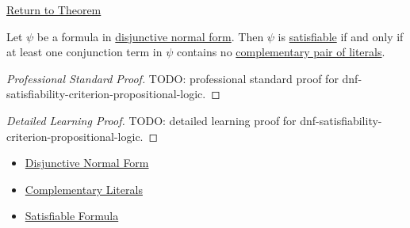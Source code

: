 \newpage
{}
\label{prf:dnf-satisfiability-criterion-propositional-logic}

\begin{remark*}[Return]
\hyperref[thm:dnf-satisfiability-criterion-propositional-logic]{Return to Theorem}
\end{remark*}

\begin{theorem*}
Let \(\psi\) be a formula in
\hyperref[def:disjunctive-normal-form-propositional-logic]{disjunctive normal form}.
Then \(\psi\) is
\hyperref[def:satisfiable-formula-propositional-logic]{satisfiable} if and only
if at least one conjunction term in \(\psi\) contains no
\hyperref[def:complementary-literals-propositional-logic]{complementary pair of literals}.
\end{theorem*}

\begin{proof}[Professional Standard Proof]
\LRAProofBodyStart
TODO: professional standard proof for dnf-satisfiability-criterion-propositional-logic.
\end{proof}

\begin{proof}[Detailed Learning Proof]
\LRAProofBodyStart
TODO: detailed learning proof for dnf-satisfiability-criterion-propositional-logic.
\end{proof}

\begin{remark*}
\end{remark*}

\begin{dependencies}
\begin{itemize}
  \item \hyperref[def:disjunctive-normal-form-propositional-logic]{Disjunctive Normal Form}
  \item \hyperref[def:complementary-literals-propositional-logic]{Complementary Literals}
  \item \hyperref[def:satisfiable-formula-propositional-logic]{Satisfiable Formula}
\end{itemize}
\end{dependencies}

\clearpage
